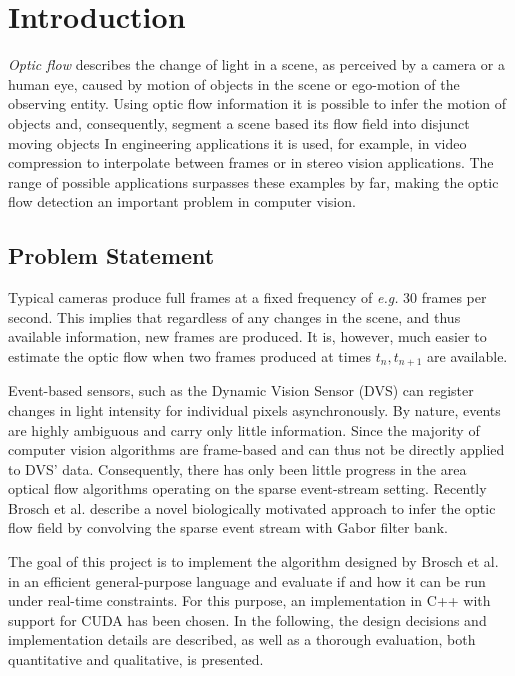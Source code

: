 \documentclass[a4paper,twoside, openright,12pt]{report}
\begin{document}
\chapter{Introduction}

\textit{Optic flow} describes the change of light in a scene, as perceived by a camera or a human eye, caused by motion of objects in the scene or ego-motion of the observing entity.
Using optic flow information it is possible to infer the motion of objects and, consequently, segment a scene based its flow field into disjunct moving objects
In engineering applications it is used, for example, in video compression to interpolate between frames or in stereo vision applications.
The range of possible applications surpasses these examples by far, making the optic flow detection an important problem in computer vision.

\section{Problem Statement}

Typical cameras produce full frames at a fixed frequency of \emph{e.g.} 30 frames per second.
This implies that regardless of any changes in the scene, and thus available information, new frames are produced.
It is, however, much easier to estimate the optic flow when two frames produced at times $t_n,t_{n+1}$ are available.

Event-based sensors, such as the Dynamic Vision Sensor (DVS) \cite{Delbruck} can register changes in light intensity for individual pixels asynchronously. By nature, events are highly ambiguous and carry only little information. Since the majority of computer vision algorithms are frame-based and can thus not be directly applied to DVS' data. Consequently, there has only been little progress in the area optical flow algorithms operating on the sparse event-stream setting.
Recently Brosch et al. \cite{Brosch2015} describe a novel biologically motivated approach to infer the optic flow field by convolving the sparse event stream with Gabor filter bank.

The goal of this project is to implement the algorithm designed by Brosch et al. in an efficient general-purpose language and evaluate if and how it can be run under real-time constraints.
For this purpose, an implementation in C++ with support for CUDA has been chosen.
In the following, the design decisions and implementation details are described, as well as a thorough evaluation, both quantitative and qualitative, is presented.
\let\cleardoublepage\clearpage
\end{document}
